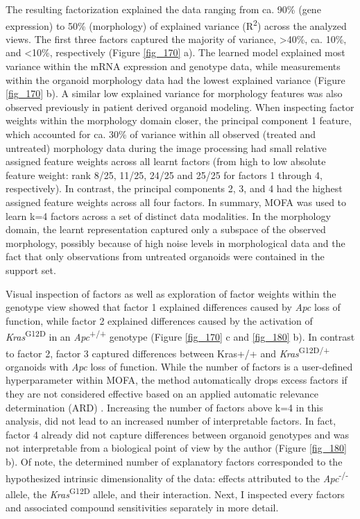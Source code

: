\begin{flushleft}
 The resulting factorization explained the data ranging from ca. 90\% (gene expression) to 50\% (morphology) of explained variance (R\textsuperscript{2}) across the analyzed views. The first three factors captured the majority of variance, >40\%, ca. 10\%, and <10\%, respectively (Figure \ref{fig_170} a). The learned model explained most variance within the mRNA expression and genotype data, while measurements within the organoid morphology data had the lowest explained variance (Figure \ref{fig_170} b). A similar low explained variance for morphology features was also observed previously in patient derived organoid modeling. When inspecting factor weights within the morphology domain closer, the principal component 1 feature, which accounted for ca. 30\% of variance within all observed (treated and untreated) morphology data during the image processing had small relative assigned feature weights across all learnt factors (from high to low absolute feature weight: rank 8/25, 11/25, 24/25 and 25/25 for factors 1 through 4, respectively). In contrast, the principal components 2, 3, and 4 had the highest assigned feature weights across all four factors. In summary, MOFA was used to learn k=4 factors across a set of distinct data modalities. In the morphology domain, the learnt representation captured only a subspace of the observed morphology, possibly because of high noise levels in morphological data and the fact that only observations from untreated organoids were contained in the support set. 
\par

Visual inspection of factors as well as exploration of factor weights within the genotype view showed that factor 1 explained differences caused by \textit{Apc} loss of function, while factor 2 explained differences caused by the activation of \textit{Kras}\textsuperscript{G12D} in an \textit{Apc}\textsuperscript{+/+} genotype (Figure \ref{fig_170} c and \ref{fig_180} b). In contrast to factor 2, factor 3 captured differences between Kras+/+ and \textit{Kras}\textsuperscript{G12D/+} organoids with \textit{Apc} loss of function. While the number of factors is a user-defined hyperparameter within MOFA, the method automatically drops excess factors if they are not considered effective based on an applied automatic relevance determination (ARD) \parencite{argelaguetMultiOmicsFactorAnalysis2018b}. Increasing the number of factors above k=4 in this analysis, did not lead to an increased number of interpretable factors. In fact, factor 4 already did not capture differences between organoid genotypes and was not interpretable from a biological point of view by the author (Figure \ref{fig_180} b). Of note, the determined number of explanatory factors corresponded to the hypothesized intrinsic dimensionality of the data: effects attributed to the \textit{Apc}\textsuperscript{-/-}  allele, the \textit{Kras}\textsuperscript{G12D} allele, and their interaction. Next, I inspected every factors and associated compound sensitivities separately in more detail.


\end{flushleft}
